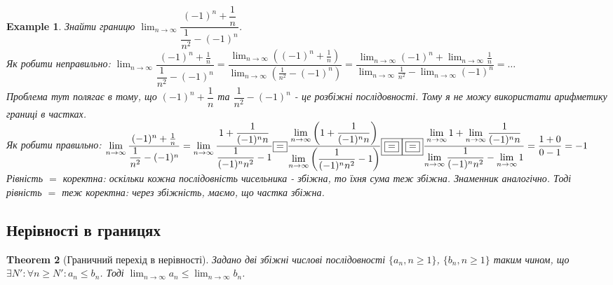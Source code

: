 \documentclass[a4paper, 14pt]{article}
\theoremstyle{theoremdd}
\newtheorem{theorem}{Theorem}[subsection]
\theoremstyle{theoremdd}
\theoremstyle{theoremdd}
\theoremstyle{theoremdd}
\newtheorem{example}[theorem]{Example}
\theoremstyle{theoremdd}
\theoremstyle{theoremdd}
\theoremstyle{theoremdd}
\theoremstyle{theoremdd}
\begin{document}
	\begin{example}
	Знайти границю $\displaystyle \lim_{n \to \infty} \dfrac{(-1)^n + \dfrac{1}{n}}{\dfrac{1}{n^2}- (-1)^n}$.\\
	Як робити неправильно: $\displaystyle \lim_{n \to \infty} \dfrac{(-1)^n + \frac{1}{n}}{\dfrac{1}{n^2}- (-1)^n} = \dfrac{\displaystyle \lim_{n \to \infty} \left( (-1)^n + \frac{1}{n} \right) }{\displaystyle \lim_{n \to \infty} \left( \frac{1}{n^2} - (-1)^n \right)} = \dfrac{\displaystyle \lim_{n \to \infty} (-1)^n + \lim_{n \to \infty} \frac{1}{n} }{\displaystyle \lim_{n \to \infty} \frac{1}{n^2} - \lim_{n \to \infty} (-1)^n} = \dots$\\
	Проблема тут полягає в тому, що $(-1)^n + \dfrac{1}{n}$ та $\dfrac{1}{n^2}-(-1)^n$ - це розбіжні послідовності. Тому я не можу використати арифметику границі в частках.\\
	Як робити правильно: $\displaystyle \lim_{n \to \infty} \dfrac{(-1)^n + \frac{1}{n}}{\dfrac{1}{n^2}- (-1)^n} = \lim_{n \to \infty} \dfrac{1 + \dfrac{1}{(-1)^n n}}{\dfrac{1}{(-1)^n n^2} - 1} \boxed{=} \dfrac{\displaystyle\lim_{n \to \infty} \left( 1 + \dfrac{1}{(-1)^n n} \right)}{\displaystyle\lim_{n \to \infty} \left( \dfrac{1}{(-1)^n n^2} - 1 \right)} \boxed{\boxed{=}}
	\\ \boxed{\boxed{=}} \dfrac{\displaystyle\lim_{n \to \infty} 1 + \lim_{n \to \infty} \dfrac{1}{(-1)^n n}}{\displaystyle\lim_{n \to \infty} \dfrac{1}{(-1)^n n^2} - \lim_{n \to \infty} 1 } = \dfrac{1+0}{0-1} = -1$\\
	Рівність $\boxed{\boxed{=}}$ коректна: оскільки кожна послідовність чисельника - збіжна, то їхня сума теж збіжна. Знаменник аналогічно. Тоді рівність $\boxed{=}$ теж коректна: через збіжність, маємо, що частка збіжна.
	\end{example}
	
	\subsection{Нерівності в границях}
	\begin{theorem}[Граничний перехід в нерівності]
	Задано дві збіжні числові послідовності $\{a_n, n \geq 1\}$, $\{b_n, n \geq 1\}$ таким чином, що $\exists N': \forall n \geq N': a_n \leq b_n$. Тоді $\displaystyle \lim_{n \to \infty} a_n \leq \lim_{n \to \infty} b_n$.
	\end{theorem}
	
\end{document}
